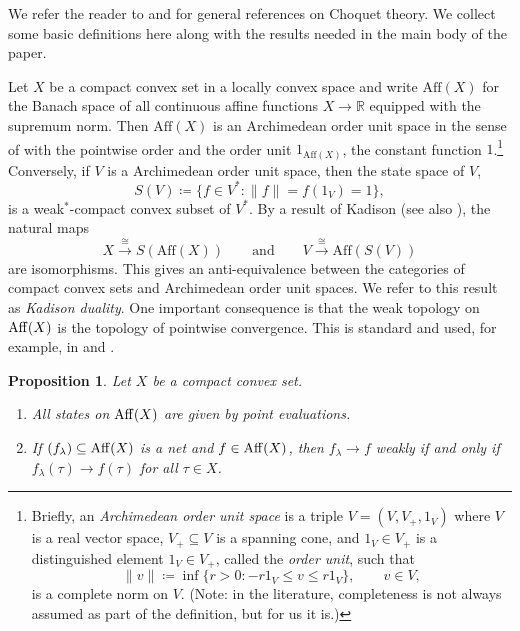 \documentclass[a4paper,11pt]{amsart}
\newtheorem{proposition}[theorem]{Proposition}
\theoremstyle{definition}
\numberwithin{equation}{section}
\numberwithin{theorem}{section}
\begin{document}
We refer the reader to \cite{Alf71} and \cite{Go86} for general references on Choquet theory.  We collect some basic definitions here along with the results needed in the main body of the paper.

Let $X$ be a compact convex set in a locally convex space and write $\mathrm{Aff}(X)$ for the Banach space of all continuous affine functions $X \rightarrow \mathbb R$ equipped with the supremum norm.  Then $\mathrm{Aff}(X)$ is an Archimedean order unit space in the sense of \cite[Section~II.1]{Alf71} with the pointwise order and the order unit $1_{\mathrm{Aff}(X)}$, the constant function $1$.\footnote{
Briefly, an \emph{Archimedean order unit space} is a triple $V = (V, V_+, 1_V)$ where $V$ is a real vector space, $V_+ \subseteq V$ is a spanning cone, and $1_V \in V_+$ is a distinguished element $1_V \in V_+$, called the \emph{order unit}, such that \[\|v\| \coloneqq \inf \{ r > 0 : -r 1_V \leq v \leq r1_V \}, \qquad  v \in V, \] is a complete norm on $V$. (Note: in the literature, completeness is not always assumed as part of the definition, but for us it is.)}
Conversely, if $V$ is a Archimedean order unit space,
then the state space of $V$,
\begin{equation}
	S(V) \coloneqq \{ f \in V^* : \|f\| = f(1_V) = 1 \},
\end{equation} 
is a weak$^*$-compact convex subset of $V^*$.  By a result of Kadison \cite{Kadison51} (see also \cite[Chapter~7]{Go86}), the natural maps
\begin{equation}
	X \overset\cong\longrightarrow S(\mathrm{Aff}(X)) \qquad \text{and} \qquad V \overset\cong\longrightarrow \mathrm{Aff}(S(V))
\end{equation}
are isomorphisms. This gives an anti-equivalence between the categories of compact convex sets and Archimedean order unit spaces.  We refer to this result as \emph{Kadison duality}.  One important consequence is that the weak topology on ${\rm Aff}(X)$ is the topology of pointwise convergence. This is standard and used, for example, in \cite{Oz13} and \cite{GGKNV}.

\begin{proposition}\label{prop:pointwise-to-uniform}
	Let $X$ be a compact convex set.
 \begin{enumerate}
     \item All states on ${\rm Aff}(X)$ are given by point evaluations.\label{prop:pointwise-to-uniform1}
     \item If $(f_\lambda) \subseteq {\rm Aff}(X)$ is a net and $f \in {\rm Aff}(X)$, then $f_\lambda \rightarrow f$ weakly if and only if $f_\lambda(\tau) \rightarrow f(\tau)$ for all $\tau \in X$.\label{prop:pointwise-to-uniform2}
 \end{enumerate}
\end{proposition}
\end{document}
